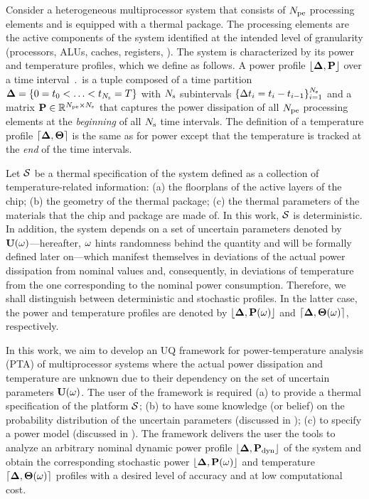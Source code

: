 Consider a heterogeneous multiprocessor system that consists of ${N_\text{pe}}$ processing elements and is equipped with a thermal package. The processing elements are the active components of the system identified at the intended level of granularity (processors, ALUs, caches, registers, \etc). The system is characterized by its power and temperature profiles, which we define as follows. A power profile $\profP$ over a time interval $\period$ is a tuple composed of a time partition $\boldsymbol{\Delta} = \{ 0 = t_0 < \dotsc < t_{N_\text{s}} = T \}$ with $N_\text{s}$ subintervals $\{ \Delta t_i = t_i - t_{i - 1} \}_{i = 1}^{N_\text{s}}$ and a matrix $\mP \in \real^{\cores \times \steps}$ that captures the power dissipation of all ${N_\text{pe}}$ processing elements at the \emph{beginning} of all $N_\text{s}$ time intervals. The definition of a temperature profile $\profT$ is the same as for power except that the temperature is tracked at the \emph{end} of the time intervals.

Let $\mathcal{S}$ be a thermal specification of the system defined as a collection of temperature-related information: (a) the floorplans of the active layers of the chip; (b) the geometry of the thermal package; (c) the thermal parameters of the materials that the chip and package are made of. In this work, $\mathcal{S}$ is deterministic. In addition, the system depends on a set of uncertain parameters denoted by $\mathbf{U}(\omega)$---hereafter, $\omega$ hints randomness behind the quantity and will be formally defined later on---which manifest themselves in deviations of the actual power dissipation from nominal values and, consequently, in deviations of temperature from the one corresponding to the nominal power consumption. Therefore, we shall distinguish between deterministic and stochastic profiles. In the latter case, the power and temperature profiles are denoted by $\profP{\o}$ and $\profT{\o}$, respectively.

In this work, we aim to develop an UQ framework for power-temperature analysis (PTA) of multiprocessor systems where the actual power dissipation and temperature are unknown due to their dependency on the set of uncertain parameters $\mathbf{U}(\omega)$. The user of the framework is required (a) to provide a thermal specification of the platform $\mathcal{S}$; (b) to have some knowledge (or belief) on the probability distribution of the uncertain parameters (discussed in ); (c) to specify a power model (discussed in ). The framework delivers the user the tools to analyze an arbitrary nominal dynamic power profile $\profPdyn$ of the system and obtain the corresponding stochastic power $\profP{\o}$ and temperature $\profT{\o}$ profiles with a desired level of accuracy and at low computational cost.

